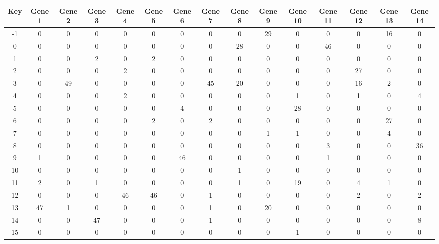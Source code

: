 \begin{tabular}{|c|c|c|c|c|c|c|c|c|c|c|c|c|c|c|}
\hline
Key & Gene 1 & Gene 2 & Gene 3 & Gene 4 & Gene 5 & Gene 6 & Gene 7 & Gene 8 & Gene 9 & Gene 10 & Gene 11 & Gene 12 & Gene 13 & Gene 14 \\
\hline
-1 & 0 & 0 & 0 & 0 & 0 & 0 & 0 & 0 & 29 & 0 & 0 & 0 & 16 & 0 \\
0 & 0 & 0 & 0 & 0 & 0 & 0 & 0 & 28 & 0 & 0 & 46 & 0 & 0 & 0 \\
1 & 0 & 0 & 2 & 0 & 2 & 0 & 0 & 0 & 0 & 0 & 0 & 0 & 0 & 0 \\
2 & 0 & 0 & 0 & 2 & 0 & 0 & 0 & 0 & 0 & 0 & 0 & 27 & 0 & 0 \\
3 & 0 & 49 & 0 & 0 & 0 & 0 & 45 & 20 & 0 & 0 & 0 & 16 & 2 & 0 \\
4 & 0 & 0 & 0 & 2 & 0 & 0 & 0 & 0 & 0 & 1 & 0 & 1 & 0 & 4 \\
5 & 0 & 0 & 0 & 0 & 0 & 4 & 0 & 0 & 0 & 28 & 0 & 0 & 0 & 0 \\
6 & 0 & 0 & 0 & 0 & 2 & 0 & 2 & 0 & 0 & 0 & 0 & 0 & 27 & 0 \\
7 & 0 & 0 & 0 & 0 & 0 & 0 & 0 & 0 & 1 & 1 & 0 & 0 & 4 & 0 \\
8 & 0 & 0 & 0 & 0 & 0 & 0 & 0 & 0 & 0 & 0 & 3 & 0 & 0 & 36 \\
9 & 1 & 0 & 0 & 0 & 0 & 46 & 0 & 0 & 0 & 0 & 1 & 0 & 0 & 0 \\
10 & 0 & 0 & 0 & 0 & 0 & 0 & 0 & 1 & 0 & 0 & 0 & 0 & 0 & 0 \\
11 & 2 & 0 & 1 & 0 & 0 & 0 & 0 & 1 & 0 & 19 & 0 & 4 & 1 & 0 \\
12 & 0 & 0 & 0 & 46 & 46 & 0 & 1 & 0 & 0 & 0 & 0 & 2 & 0 & 2 \\
13 & 47 & 1 & 0 & 0 & 0 & 0 & 1 & 0 & 20 & 0 & 0 & 0 & 0 & 0 \\
14 & 0 & 0 & 47 & 0 & 0 & 0 & 1 & 0 & 0 & 0 & 0 & 0 & 0 & 8 \\
15 & 0 & 0 & 0 & 0 & 0 & 0 & 0 & 0 & 0 & 1 & 0 & 0 & 0 & 0 \\
\hline
\end{tabular}